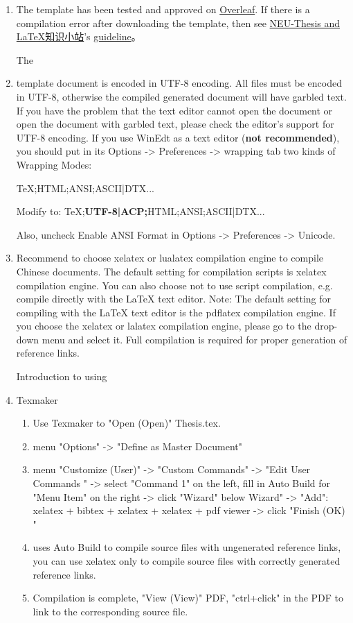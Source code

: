\begin{enumerate}
    \item The template has been tested and approved on \href{https://www.overleaf.com/}{Overleaf}. If there is a compilation error after downloading the template, then see \href{https://github.com/sci-m-wang/NEU-Thesis-en/wiki}{NEU-Thesis and LaTeX知识小站}'s \href{https://github.com/sci-m-wang/NEU-Thesis-en/wiki/%E7%BC%96%E8%AF%91%E6%8C%87%E5%8D%97}{guideline}。

    The \item template document is encoded in UTF-8 encoding. All files must be encoded in UTF-8, otherwise the compiled generated document will have garbled text. If you have the problem that the text editor cannot open the document or open the document with garbled text, please check the editor's support for UTF-8 encoding. If you use WinEdt as a text editor (\textbf {not recommended}), you should put in its Options -> Preferences -> wrapping tab two kinds of Wrapping Modes:
        
        TeX;HTML;ANSI;ASCII|DTX...
        
        Modify to: TeX;\textbf{UTF-8|ACP;}HTML;ANSI;ASCII|DTX...
        
        Also, uncheck Enable ANSI Format in Options -> Preferences -> Unicode.

    \item Recommend to choose xelatex or lualatex compilation engine to compile Chinese documents. The default setting for compilation scripts is xelatex compilation engine. You can also choose not to use script compilation, e.g. compile directly with the LaTeX text editor. Note: The default setting for compiling with the LaTeX text editor is the pdflatex compilation engine. If you choose the xelatex or lalatex compilation engine, please go to the drop-down menu and select it. Full compilation is required for proper generation of reference links.

    Introduction to using \item Texmaker
        \begin{enumerate}
            \footnotesize
            \item Use Texmaker to "Open (Open)" Thesis.tex.
            \item menu "Options" -> "Define as Master Document"
            \item menu "Customize (User)" -> "Custom Commands" -> "Edit User Commands " -> select "Command 1" on the left, fill in Auto Build for "Menu Item" on the right -> click "Wizard" below Wizard" -> "Add": xelatex + bibtex + xelatex + xelatex + pdf viewer -> click "Finish (OK) "
            \item uses Auto Build to compile source files with ungenerated reference links, you can use xelatex only to compile source files with correctly generated reference links.
            \item Compilation is complete, "View (View)" PDF, "ctrl+click" in the PDF to link to the corresponding source file.
        \end{enumerate}
    

\end{enumerate}
